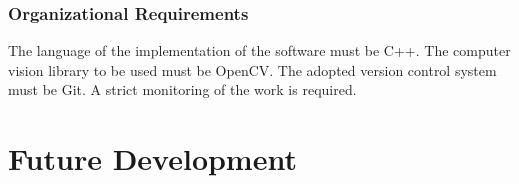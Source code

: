 			\subsubsection{Organizational Requirements}
			The language of the implementation of the software must be C++. 
			The computer vision library to be used must be OpenCV.
			The adopted version control system must be Git.
			A strict monitoring of the work is required.

	\section{Future Development}\label{futureDev}

